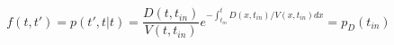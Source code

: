 \begin{equation}
f(t,t') = p(t',t|t)=  \frac{D(t,t_{in})}{V(t,t_{in})}e^{-\int_{t_{in}}^t D(x,t_{in})/V(x,t_{in}) dx} = p_D(t_{in})
\end{equation}